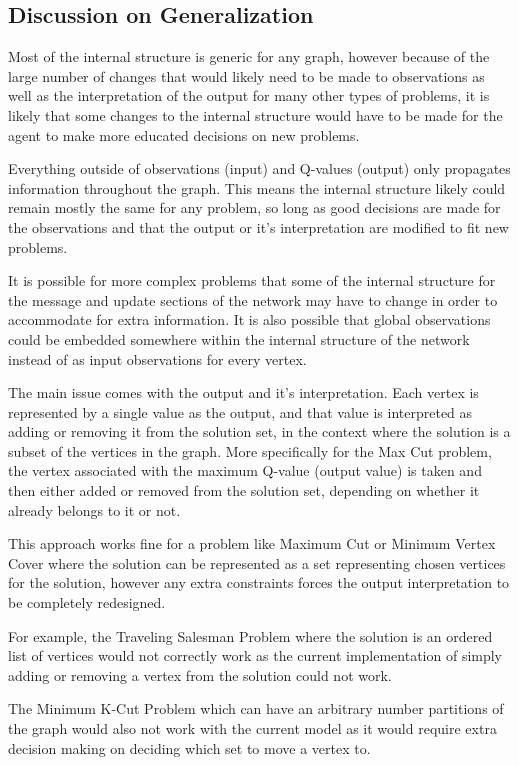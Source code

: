 \documentclass{article}
\begin{document}
\subsection{Discussion on Generalization}

Most of the internal structure is generic for any graph, however because of the large number of changes that would likely need to be made to observations as well as the interpretation of the output for many other types of problems, it is likely that some changes to the internal structure would have to be made for the agent to make more educated decisions on new problems.

Everything outside of observations (input) and Q-values (output) only propagates information throughout the graph. This means the internal structure likely could remain mostly the same for any problem, so long as good decisions are made for the observations and that the output or it's interpretation are modified to fit new problems.

It is possible for more complex problems that some of the internal structure for the message and update sections of the network may have to change in order to accommodate for extra information. It is also possible that global observations could be embedded somewhere within the internal structure of the network instead of as input observations for every vertex.

The main issue comes with the output and it's interpretation. Each vertex is represented by a single value as the output, and that value is interpreted as adding or removing it from the solution set, in the context where the solution is a subset of the vertices in the graph. More specifically for the Max Cut problem, the vertex associated with the maximum Q-value (output value) is taken and then either added or removed from the solution set, depending on whether it already belongs to it or not. 

This approach works fine for a problem like Maximum Cut or Minimum Vertex Cover where the solution can be represented as a set representing chosen vertices for the solution, however any extra constraints forces the output interpretation to be completely redesigned.

For example, the Traveling Salesman Problem where the solution is an ordered list of vertices would not correctly work as the current implementation of simply adding or removing a vertex from the solution could not work.

The Minimum K-Cut Problem which can have an arbitrary number partitions of the graph would also not work with the current model as it would require extra decision making on deciding which set to move a vertex to.
\end{document}
